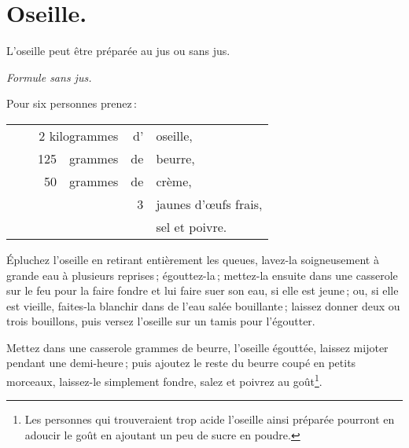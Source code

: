 \section*{\centering Oseille.}
{}

L'oseille peut être préparée au jus ou sans jus.

\medskip

\begin{center}
\textit{Formule sans jus.}
\end{center}

Pour six personnes prenez :

\footnotesize
\begin{longtable}{rrrrrp{18em}}
  & \multicolumn{3}{r}{2 kilogrammes} & d' & oseille,                                                     \\
  &  \hspace{2em} & 125 & grammes & de & beurre,                                                          \\
  &  \hspace{2em} &  50 & grammes & de & crème,                                                           \\
  &  \hspace{2em} &     &         &  3 & jaunes d'œufs frais,                                             \\
  &  \hspace{2em} &     &         &    & sel et poivre.                                                   \\
\end{longtable}
\normalsize

Épluchez l'oseille en retirant entièrement les queues, lavez-la soigneusement
à grande eau à plusieurs reprises ; égouttez-la ; mettez-la ensuite dans une
casserole sur le feu pour la faire fondre et lui faire suer son eau, si elle
est jeune ; ou, si elle est vieille, faites-la blanchir dans de l'eau salée
bouillante ; laissez donner deux ou trois bouillons, puis versez l'oseille sur
un tamis pour l'égoutter.

Mettez dans une casserole {\mmm} grammes de beurre, l'oseille égouttée,
laissez mijoter pendant une demi-heure ; puis ajoutez le reste du beurre coupé
en petits morceaux, laissez-le simplement fondre, salez et poivrez au
goût\footnote{Les personnes qui trouveraient trop acide l'oseille ainsi
préparée pourront en adoucir le goût en ajoutant un peu de sucre en poudre.}.

